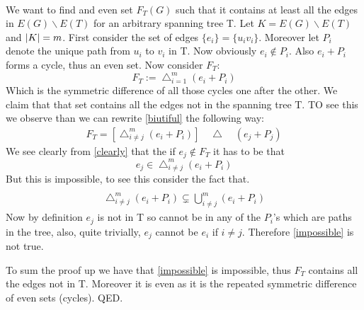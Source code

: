 \documentclass{article}
\DeclarePairedDelimiter{\abs}{\lvert}{\rvert}
\begin{document}
	\\
	
	\clearpage
	
	We want to find and even set $F_T(G)$ such that it contains at least all the edges in $E(G)\backslash E(T)$ for an arbitrary spanning tree T. Let $K = E(G)\backslash E(T)$ and $\abs K = m$. First consider the set of edges $\{e_i\} = \{u_iv_i\}$. Moreover let $P_i$ denote the unique path from $u_i$ to $v_i$ in T. Now obviously $e_i\notin P_i$. Also $e_i + P_i$ forms a cycle, thus an even set. Now consider $F_T$:
	\begin{equation}\label{biutiful}
		F_T:=\mathop\bigtriangleup_{i=1}^{m} (e_i + P_i)
	\end{equation}
	Which is the symmetric difference of all those cycles one after the other. We claim that that set contains all the edges not in the spanning tree T. TO see this we observe than we can rewrite \ref{biutiful} the following way:
	\begin{align}\label{clearly}
		F_T = \left[\mathop\bigtriangleup_{i \neq j}^{m}(e_i+P_i)\right] \quad \bigtriangleup  \quad (e_j + P_j)
	\end{align}
	We see clearly from \ref{clearly} that the if $e_j\notin F_T$ it has to be that 
	\begin{equation}\label{impossible}
		e_j \in \mathop\bigtriangleup_{i \neq j}^{m}(e_i+P_i)
	\end{equation}
	But this is impossible, to see this consider the fact that. 
	\begin{align*}\\
		\mathop\bigtriangleup_{i \neq j}^{m}(e_i+P_i) \subsetneq \bigcup_{i\neq j}^{m}(e_i + P_i) 
	\end{align*}
	Now by definition $e_j$ is not in T so cannot be in any of the $P_i$'s which are paths in the tree, also, quite trivially, $e_j$ cannot be $e_i$ if $i\neq j$. Therefore \ref{impossible} is not true. 
	
	To sum the proof up we have that \ref{impossible} is impossible, thus $F_T$ contains all the edges not in T. Moreover it is even as it is the repeated symmetric difference of even sets (cycles). QED.
	
	\clearpage
	\section{}
	
\end{document}
